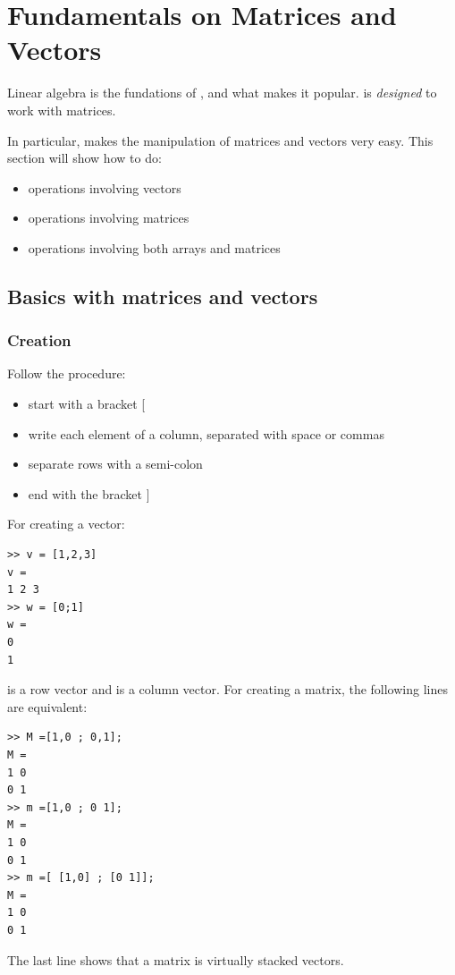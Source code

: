 \chapter{Fundamentals on Matrices and Vectors}
	Linear algebra is the fundations of \matlab, and what makes it popular.
	\matlab is \emph{designed} to work with matrices.

	In particular, \matlab makes the manipulation of matrices and vectors very easy.
	This section will show how to do:
	\begin{itemize}
		\item operations involving vectors
		\item operations involving matrices
		\item operations involving both arrays and matrices
	\end{itemize}


\section{Basics with matrices and vectors}

	\subsection{Creation}
		Follow the procedure:
		\begin{itemize}
			\item start with a bracket [
			\item write each element of a column, separated with space or commas
			\item separate rows with a semi-colon
			\item end with the bracket ]
		\end{itemize}
		For creating a vector:
\begin{lstlisting}
>> v = [1,2,3]
v =
1 2 3
>> w = [0;1]
w =
0
1
\end{lstlisting}
		 is a row vector and  is a column vector.
		For creating a matrix, the following lines are equivalent:
\begin{lstlisting}
>> M =[1,0 ; 0,1];
M = 
1 0
0 1
>> m =[1,0 ; 0 1];
M = 
1 0
0 1
>> m =[ [1,0] ; [0 1]];
M = 
1 0
0 1
\end{lstlisting}
		The last line shows that a matrix is virtually stacked vectors.

